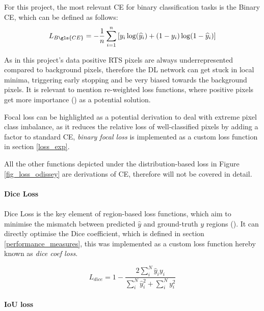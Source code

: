 For this project, the most relevant \gls{CE} for binary classification tasks is the Binary \gls{CE}, which can be defined as follows:
\begin{equation} \label{eq:bintropy}
L_{B\gls{CE}} = -\frac{1}{n}\sum_{i=1}^n{[y_{i} \log(\widehat{y}_{i})+(1-y_{i})\log(1-\widehat{y}_{i})]}
\end{equation}

As in this project's data positive \gls{RTS} pixels are always underrepresented compared to background pixels, therefore the \gls{DL} network can get stuck in local minima, triggering early stopping and be very biased towards the background pixels. 
 It is relevant to mention re-weighted loss functions, where positive pixels get more importance (\cite{ronneberger2015unet}) as a potential solution.
 
 
Focal loss can be highlighted as a potential derivation to deal with extreme pixel class imbalance, as it reduces the relative loss of well-classified pixels by adding a factor to standard \gls{CE}, \textit{binary focal loss} is implemented as a custom loss function in section \ref{loss_exp}.
 
 
All the other functions depicted under the distribution-based loss in Figure \ref{fig_loss_odissey} are derivations of \gls{CE}, therefore will not be covered in detail. 
\paragraph{Dice Loss}
\paragraph{}
Dice Loss is the key element of region-based loss functions, which aim to minimise the mismatch between predicted $\widehat{y}$  and ground-truth $y$ regions (\cite{LossOdyssey}). It can directly optimise the Dice coefficient, which is defined in section \ref{performance_measures}, this was implemented as a custom loss function hereby known as \textit{dice coef loss}.

\begin{equation}\label{eq_dice_loss}
L_{dice}=1-\frac{2\sum_{{i}}^{N}\widehat{y}_{i}y_{i}}{\sum_{i}^{N}\widehat{y}_{i}^{2}+\sum_{i}^{N}y_{{i}}^{2}}
\end{equation}

\paragraph{\gls{IoU} loss}
